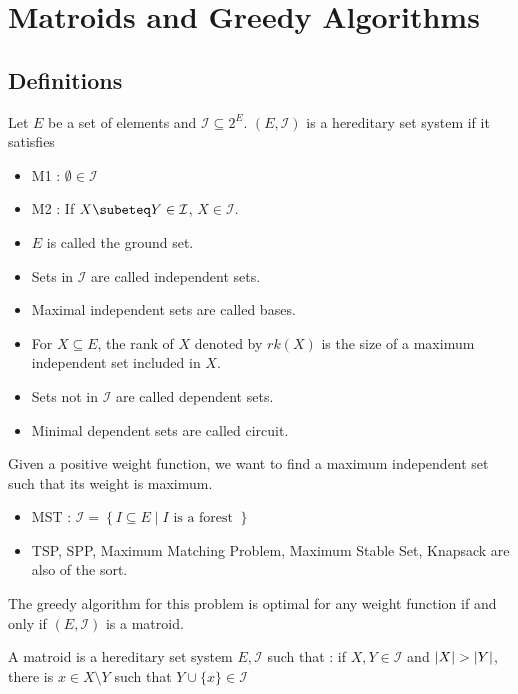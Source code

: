 \documentclass{cours}
\begin{document}
        \section{Matroids and Greedy Algorithms}
        \subsection{Definitions}
        \begin{definition}
            Let $E$ be a set of elements and $\mathcal{I} \subseteq 2^{E}$. $\left(E, \mathcal{I}\right)$ is a hereditary set system if it satisfies
            \begin{itemize}
                \item M1 : $\emptyset \in \mathcal{I}$
                \item M2 : If $X \subeteq Y \in \mathcal{I}$, $X \in \mathcal{I}$.
            \end{itemize}
            \begin{itemize}
                \item $E$ is called the ground set.
                \item Sets in $\mathcal{I}$ are called independent sets.
                \item Maximal independent sets are called bases.
                \item For $X \subseteq E$, the rank of $X$ denoted by $rk(X)$ is the size of a maximum independent set included in $X$.
                \item Sets not in $\mathcal{I}$ are called dependent sets.
                \item Minimal dependent sets are called circuit.
            \end{itemize}
        \end{definition}

        Given a positive weight function, we want to find a maximum independent set such that its weight is maximum.

        \begin{example}
            \begin{itemize}
                \item MST : $\mathcal{I} = \left\{I \subseteq E \mid I \text{ is a forest } \right\}$
                \item TSP, SPP, Maximum Matching Problem, Maximum Stable Set, Knapsack are also of the sort.
            \end{itemize}
        \end{example}

        \begin{theorem}
            The greedy algorithm for this problem is optimal for any weight function if and only if $\left(E, \mathcal{I}\right)$ is a matroid.
        \end{theorem}

        \begin{definition}
            A matroid is a hereditary set system $E, \mathcal{I}$ such that : if $X, Y \in \mathcal{I}$ and $\left|X\right| > \left|Y\right|$, there is $x \in X \setminus Y$ such that $Y \cup \{x\} \in \mathcal{I}$
        \end{definition}
\end{document}
